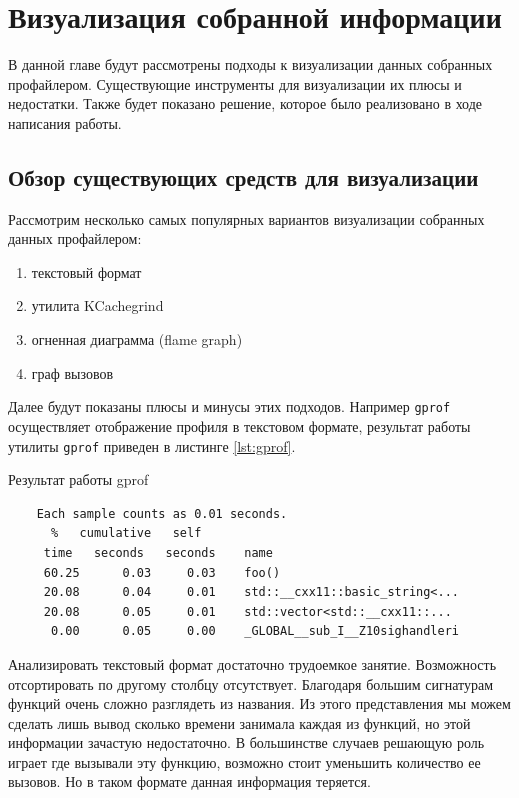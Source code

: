 
\chapter{Визуализация собранной информации}
	В данной главе будут рассмотрены подходы к визуализации данных собранных профайлером. Существующие инструменты для визуализации их плюсы и недостатки. Также будет показано решение, которое было реализовано в ходе написания работы. 

\section{Обзор существующих средств для визуализации}
	Рассмотрим несколько самых популярных вариантов визуализации собранных данных профайлером:
    \begin{enumerate}
    	\item текстовый формат
        \item утилита KCachegrind
        \item огненная диаграмма (flame graph)
        \item граф вызовов
    \end{enumerate}

	Далее будут показаны плюсы и минусы этих подходов. Например \verb|gprof| осуществляет отображение профиля в текстовом формате, результат работы утилиты \verb|gprof| приведен в листинге \ref{lst:gprof}.
    
\begin{algorithm}[!h]
  \caption{Результат работы gprof}
  \label{lst:gprof}
  \begin{lstlisting}
    Each sample counts as 0.01 seconds.
      %   cumulative   self              
     time   seconds   seconds    name    
     60.25      0.03     0.03    foo()
     20.08      0.04     0.01    std::__cxx11::basic_string<...
     20.08      0.05     0.01    std::vector<std::__cxx11::...
      0.00      0.05     0.00    _GLOBAL__sub_I__Z10sighandleri
  \end{lstlisting}
\end{algorithm}

	Анализировать текстовый формат достаточно трудоемкое занятие. Возможность отсортировать по другому столбцу отсутствует. Благодаря большим сигнатурам функций очень сложно разглядеть из названия. Из этого представления мы можем сделать лишь вывод сколько времени занимала каждая из функций, но этой информации зачастую недостаточно. В большинстве случаев решающую роль играет где вызывали эту функцию, возможно стоит уменьшить количество ее вызовов. Но в таком формате данная информация теряется. 
    
